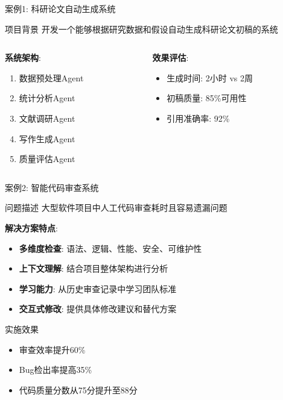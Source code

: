 \documentclass[aspectratio=169]{beamer}
\begin{document}
\begin{frame}{案例1: 科研论文自动生成系统}
\begin{block}{项目背景}
开发一个能够根据研究数据和假设自动生成科研论文初稿的系统
\end{block}

\begin{columns}
\begin{column}{0.6\textwidth}
\textbf{系统架构}:
\begin{enumerate}
    \item 数据预处理Agent
    \item 统计分析Agent  
    \item 文献调研Agent
    \item 写作生成Agent
    \item 质量评估Agent
\end{enumerate}
\end{column}
\begin{column}{0.4\textwidth}
\textbf{效果评估}:
\begin{itemize}
    \item 生成时间: 2小时 vs 2周
    \item 初稿质量: 85\%可用性
    \item 引用准确率: 92\%
\end{itemize}
\end{column}
\end{columns}
\end{frame}

\begin{frame}{案例2: 智能代码审查系统}
\begin{block}{问题描述}
大型软件项目中人工代码审查耗时且容易遗漏问题
\end{block}

\textbf{解决方案特点}:
\begin{itemize}
    \item \textbf{多维度检查}: 语法、逻辑、性能、安全、可维护性
    \item \textbf{上下文理解}: 结合项目整体架构进行分析
    \item \textbf{学习能力}: 从历史审查记录中学习团队标准
    \item \textbf{交互式修改}: 提供具体修改建议和替代方案
\end{itemize}

\begin{block}{实施效果}
\begin{itemize}
    \item 审查效率提升60\%
    \item Bug检出率提高35\%
    \item 代码质量分数从75分提升至88分
\end{itemize}
\end{block}
\end{frame}
\end{document}
